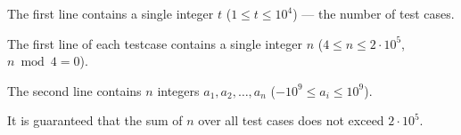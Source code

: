 The first line contains a single integer $t$ ($1 \le t \le 10^4$) --- the number of test cases.

The first line of each testcase contains a single integer $n$ ($4 \le n \le 2 \cdot 10^5$, $n \bmod 4 = 0$).

The second line contains $n$ integers $a_1, a_2, \dots, a_n$ ($-10^9 \le a_i \le 10^9$).

It is guaranteed that the sum of $n$ over all test cases does not exceed $2 \cdot 10^5$.